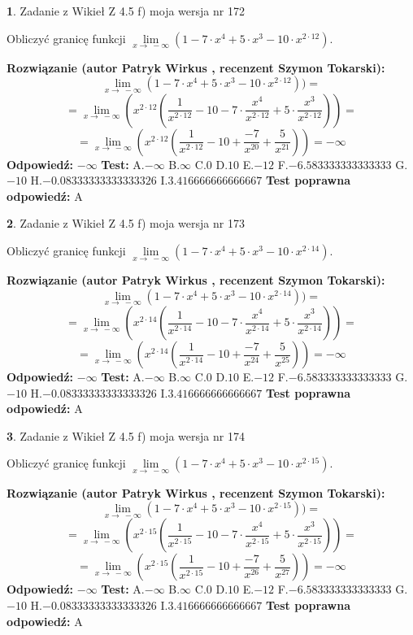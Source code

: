 \documentclass[12pt, a4paper]{article}
\theoremstyle{definition} %
\newtheorem{zad}{}
\newcommand{\zadStart}[1]{\begin{zad}#1\newline}
\newcommand{\zadStop}{\end{zad}}
\newcommand{\rozwStart}[2]{\noindent \textbf{Rozwiązanie (autor #1 , recenzent #2): }\newline}
\newcommand{\rozwStop}{\newline}
\newcommand{\odpStart}{\noindent \textbf{Odpowiedź:}\newline}
\newcommand{\odpStop}{\newline}
\newcommand{\testStart}{\noindent \textbf{Test:}\newline}
\newcommand{\testStop}{\newline}
\newcommand{\kluczStart}{\noindent \textbf{Test poprawna odpowiedź:}\newline}
\newcommand{\kluczStop}{\newline}
\begin{document}
\zadStart{Zadanie z Wikieł Z 4.5 f) moja wersja nr 172}


Obliczyć granicę funkcji  $\lim\limits_{x\to\ -\infty}(1 - 7 \cdot x^{4}+5 \cdot x^{3}- 10 \cdot x^{2\cdot12})$.
\zadStop
\rozwStart{Patryk Wirkus}{Szymon Tokarski}
$$\lim\limits_{x\to\ -\infty}(1 - 7 \cdot x^{4}+5 \cdot x^{3}- 10 \cdot x^{2\cdot12}))=$$
$$=\lim\limits_{x\to\ -\infty}(x^{2\cdot12}(\frac{1}{x^{2\cdot12}}-10 -7 \cdot \frac{x^{4}}{x^{2\cdot12}}+5 \cdot \frac{x^{3}}{x^{2\cdot12}}))=$$
$$=\lim\limits_{x\to\ -\infty}(x^{2\cdot12}(\frac{1}{x^{2\cdot12}}-10 + \frac{-7}{x^{20}}+ \frac{5}{x^{21}}))=-\infty$$
\rozwStop
\odpStart
$-\infty$
\odpStop
\testStart
A.$-\infty$ B.$\infty$ C.$0$ D.$10$ E.$-12$
F.$-6.583333333333333$ G.$-10$
H.$-0.08333333333333326$
I.$3.416666666666667$
\testStop
\kluczStart
A
\kluczStop



\zadStart{Zadanie z Wikieł Z 4.5 f) moja wersja nr 173}


Obliczyć granicę funkcji  $\lim\limits_{x\to\ -\infty}(1 - 7 \cdot x^{4}+5 \cdot x^{3}- 10 \cdot x^{2\cdot14})$.
\zadStop
\rozwStart{Patryk Wirkus}{Szymon Tokarski}
$$\lim\limits_{x\to\ -\infty}(1 - 7 \cdot x^{4}+5 \cdot x^{3}- 10 \cdot x^{2\cdot14}))=$$
$$=\lim\limits_{x\to\ -\infty}(x^{2\cdot14}(\frac{1}{x^{2\cdot14}}-10 -7 \cdot \frac{x^{4}}{x^{2\cdot14}}+5 \cdot \frac{x^{3}}{x^{2\cdot14}}))=$$
$$=\lim\limits_{x\to\ -\infty}(x^{2\cdot14}(\frac{1}{x^{2\cdot14}}-10 + \frac{-7}{x^{24}}+ \frac{5}{x^{25}}))=-\infty$$
\rozwStop
\odpStart
$-\infty$
\odpStop
\testStart
A.$-\infty$ B.$\infty$ C.$0$ D.$10$ E.$-12$
F.$-6.583333333333333$ G.$-10$
H.$-0.08333333333333326$
I.$3.416666666666667$
\testStop
\kluczStart
A
\kluczStop



\zadStart{Zadanie z Wikieł Z 4.5 f) moja wersja nr 174}


Obliczyć granicę funkcji  $\lim\limits_{x\to\ -\infty}(1 - 7 \cdot x^{4}+5 \cdot x^{3}- 10 \cdot x^{2\cdot15})$.
\zadStop
\rozwStart{Patryk Wirkus}{Szymon Tokarski}
$$\lim\limits_{x\to\ -\infty}(1 - 7 \cdot x^{4}+5 \cdot x^{3}- 10 \cdot x^{2\cdot15}))=$$
$$=\lim\limits_{x\to\ -\infty}(x^{2\cdot15}(\frac{1}{x^{2\cdot15}}-10 -7 \cdot \frac{x^{4}}{x^{2\cdot15}}+5 \cdot \frac{x^{3}}{x^{2\cdot15}}))=$$
$$=\lim\limits_{x\to\ -\infty}(x^{2\cdot15}(\frac{1}{x^{2\cdot15}}-10 + \frac{-7}{x^{26}}+ \frac{5}{x^{27}}))=-\infty$$
\rozwStop
\odpStart
$-\infty$
\odpStop
\testStart
A.$-\infty$ B.$\infty$ C.$0$ D.$10$ E.$-12$
F.$-6.583333333333333$ G.$-10$
H.$-0.08333333333333326$
I.$3.416666666666667$
\testStop
\kluczStart
A
\kluczStop
\end{document}

